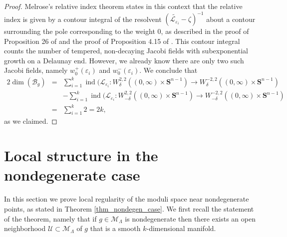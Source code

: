 \documentclass[reqno,11pt]{amsart}
\theoremstyle{tttheorem}
\newcommand{\Ss}{\mathbf{S}}
\begin{document}
\begin{proof}
Melrose's relative index theorem states in this context that the 
relative index is given by a contour integral of the resolvent 
$(\widetilde{\mathcal{L}_{\varepsilon_i}} - \zeta)^{-1}$ about a 
contour surrounding the pole corresponding to the weight $0$, 
as described in the proof of Proposition 26 of \cite{jesse2020} and 
the proof of Proposition 4.15 of \cite{MPU}. This contour integral 
counts the number of tempered, non-decaying Jacobi fields 
with subexponential growth on a Delaunay end. However, we already 
know there are only two such Jacobi fields, namely $w_0^+(\varepsilon_i)$
and $w_0^-(\varepsilon_i)$. We conclude that 
\begin{eqnarray*} 
2 \dim (\mathcal{B}_g) & = & \sum_{i=1}^k \operatorname{ind} 
(\mathcal{L}_{\varepsilon_i}: W^{2,2}_\delta ((0,\infty) \times \Ss^{n-1}) \rightarrow
W^{-2,2}_\delta ((0,\infty) \times \Ss^{n-1}) \\ 
&&  - \sum_{i=1}^k \operatorname{ind} 
(\mathcal{L}_{\varepsilon_i}: W^{2,2}_{-\delta} ((0,\infty) \times \Ss^{n-1}) \rightarrow
W^{-2,2}_{-\delta} ((0,\infty) \times \Ss^{n-1}) \\ 
& = & \sum_{i=1}^k 2 = 2k, 
\end{eqnarray*} 
as we claimed. 
\end{proof} 

\section{Local structure in the nondegenerate case} \label{sec:nondegen}  

In this section we prove local regularity of the moduli space near nondegenerate 
points, as stated in Theorem \ref{thm_nondegen_case}. We first recall the 
statement of the theorem, namely that if $g \in \mathcal{M}_\Lambda$ is 
nondegenerate then there exists an open neighborhood $\mathcal{U}
\subset \mathcal{M}_\Lambda$ of $g$ that is a smooth $k$-dimensional 
manifold. 
\end{document}
